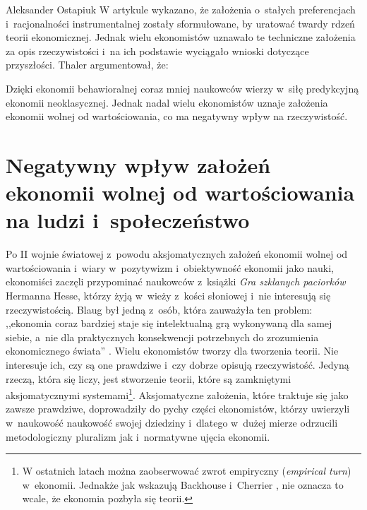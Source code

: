 \begin{artplenv}{Aleksander Ostapiuk}
W artykule wykazano, że założenia o~stałych preferencjach i~racjonalności instrumentalnej zostały sformułowane, by uratować
twardy rdzeń teorii ekonomicznej. Jednak wielu ekonomistów uznawało te techniczne założenia za opis rzeczywistości i~na
ich podstawie wyciągało wnioski dotyczące przyszłości. Thaler argumentował, że:

Dzięki ekonomii behawioralnej coraz mniej naukowców wierzy w~siłę predykcyjną ekonomii neoklasycznej. Jednak nadal wielu
ekonomistów uznaje założenia ekonomii wolnej od wartościowania, co ma negatywny wpływ na rzeczywistość. 

\section{Negatywny wpływ założeń ekonomii wolnej od wartościowania na ludzi i~społeczeństwo}
Po II wojnie światowej z~powodu aksjomatycznych założeń ekonomii wolnej od
wartościowania i~wiary w~pozytywizm i~obiektywność ekonomii jako nauki,
ekonomiści zaczęli przypominać naukowców z~książki \textit{Gra szklanych paciorków}
Hermanna Hesse, którzy żyją w~wieży z~kości słoniowej i~nie interesują się rzeczywistością. Blaug był jedną z~osób,
która zauważyła ten problem: ,,ekonomia coraz bardziej staje się intelektualną grą wykonywaną dla samej siebie, a~nie dla
praktycznych konsekwencji potrzebnych do zrozumienia ekonomicznego świata''
\parencite[s.~3]{blaug_ugly_1997}.
Wielu ekonomistów tworzy dla tworzenia teorii.
Nie interesuje ich, czy są one prawdziwe i~czy dobrze opisują rzeczywistość.
Jedyną rzeczą, która się liczy, jest stworzenie teorii, które są zamkniętymi aksjomatycznymi
systemami\footnote{W ostatnich latach można zaobserwować zwrot empiryczny
(\textit{empirical turn}) w~ekonomii.
Jednakże jak wskazują Backhouse i~Cherrier
\parencite*{backhouse_age_2017},
nie oznacza to wcale, że ekonomia
pozbyła się teorii.}. Aksjomatyczne założenia, które traktuje się jako zawsze prawdziwe, doprowadziły do pychy części ekonomistów, którzy
uwierzyli w~naukowość naukowość swojej dziedziny i~dlatego w~dużej mierze odrzucili metodologiczny pluralizm jak i~normatywne ujęcia ekonomii.


\end{artplenv}
